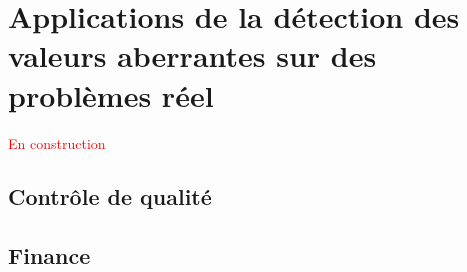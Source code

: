 \section{Applications de la détection des valeurs aberrantes sur des problèmes réel}
 \textcolor{red}{En construction}
%
\subsection{Contrôle de qualité}
\subsection{Finance}